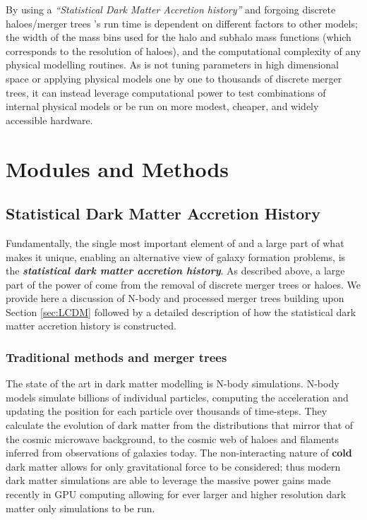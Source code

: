 By using a \textit{``Statistical Dark Matter Accretion history''} and forgoing discrete haloes/merger trees \steel's run time is dependent on different factors to other models; the width of the mass bins used for the halo and subhalo mass functions (which corresponds to the resolution of haloes), and the computational complexity of any physical modelling routines. As \steel is not tuning parameters in high dimensional space or applying physical models one by one to thousands of discrete merger trees, it can instead leverage computational power to test combinations of internal physical models or be run on more modest, cheaper, and widely accessible hardware.

\section{Modules and Methods}

\subsection{Statistical Dark Matter Accretion History}
\label{subsec:SDMAH}

Fundamentally, the single most important element of \steel and a large part of what makes it unique, enabling an alternative view of galaxy formation problems, is the \textbf{\textit{statistical dark matter accretion history}}. As described above, a large part of the power of \steel come from the removal of discrete merger trees or haloes. We provide here a discussion of N-body and processed merger trees building upon Section \ref{sec:LCDM} followed by a detailed description of how the statistical dark matter accretion history is constructed.

\subsubsection{Traditional methods and merger trees}


The state of the art in dark matter modelling is N-body simulations. N-body models simulate billions of individual particles, computing the acceleration and updating the position for each particle over thousands of time-steps. They calculate the evolution of dark matter from the distributions that mirror that of the cosmic microwave background, to the cosmic web of haloes and filaments inferred from observations of galaxies today. The non-interacting nature of \textbf{cold} dark matter allows for only gravitational force to be considered; thus modern dark matter simulations are able to leverage the massive power gains made recently in GPU computing allowing for ever larger and higher resolution dark matter only simulations to be run. 

